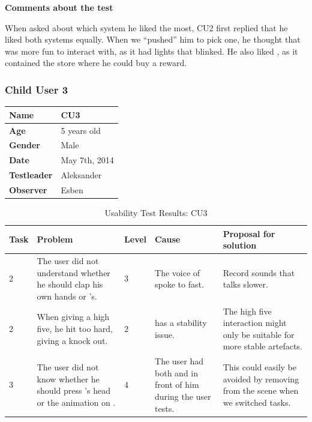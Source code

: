 \textbf{Comments about the test}

When asked about which system he liked the most, CU2 first replied that he liked both systems equally. When we ``pushed'' him to pick one, he thought that \ab{} was more fun to interact with, as it had lights that blinked. He also liked \app{}, as it contained the store where he could buy a reward. 


\subsubsection{Child User 3}
\begin{table}[H]
\centering
\begin{tabular}{| p{4.0cm} | p{4.0cm} |}
\hline
 \textbf{Name} & CU3 \\
 \hline
 \textbf{Age} & 5 years old \\
 \hline 
 \textbf{Gender} & Male \\
 \hline
 \textbf{Date} & May 7th, 2014 \\
 \hline
 \textbf{Testleader} & Aleksander \\
 \hline
 \textbf{Observer} & Esben \\
 \hline
\end{tabular}
\end{table}


\begin{table}[H]
\centering
\begin{tabular}{| p{1.0cm} | p{4.0cm} | p{0.9cm} | p{3.1cm} | p{3.5cm} |}
	\hline
	\textbf{Task} & \textbf{Problem} & \textbf{Level} & \textbf{Cause} & \textbf{Proposal for solution} \\
	\hline
	2 & The user did not understand whether he should clap his own hands or \ab{}'s. & 3 & The voice of \ab{} spoke to fast. & Record sounds that talks slower. \\
	\hline
	2 & When giving \ab{} a high five, he hit too hard, giving \ab{} a knock out. & 2 & \ab{} has a stability issue. & The high five interaction might only be suitable for more stable artefacts. \\
	\hline
	3 & The user did not know whether he should press \ab{}'s head or the animation on \app{}. & 4 & The user had both \ab{} and \app{} in front of him during the user tests. & This could easily be avoided by removing \ab{} from the scene when we switched tasks. \\
	\hline  
\end{tabular}
\caption{Usability Test Results: CU3}
\label{tab:testchild3}
\end{table}

